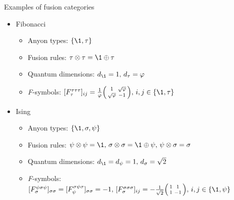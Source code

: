 \documentclass{fdubeamer}
\begin{document}
\begin{frame}{Examples of fusion categories}

\linespread{1.4}
\selectfont

\begin{itemize}
  \item Fibonacci

    \begin{itemize}
      \item Anyon types: $\{\1, \tau\}$
      \item Fusion rules: $\tau\otimes\tau=\1\oplus\tau$
      \item Quantum dimensions: $d_{\1}=1, \, d_\tau=\varphi$
      \item \textit{F}-symbols:
        $
          [F^{\tau\tau\tau}_\tau]_{ij} = \frac{1}{\varphi} \Bigl(\begin{smallmatrix} 1 & \sqrt\varphi \\ \sqrt\varphi & -1 \end{smallmatrix}\Bigr), \,
          i,j \in \{\1, \tau\}
        $
    \end{itemize}

  \item Ising

    \begin{itemize}
      \item Anyon types: $\{\1, \sigma, \psi\}$
      \item Fusion rules: $\psi\otimes\psi=\1, \, \sigma\otimes\sigma=\1\oplus\psi, \, \psi\otimes\sigma=\sigma$
      \item Quantum dimensions: $d_{\1}=d_\psi=1, \, d_\sigma=\sqrt2$
      \item \textit{F}-symbols:
        $
          [F^{\psi\sigma\psi}_\sigma]_{\sigma\sigma} = [F^{\sigma\psi\sigma}_\psi]_{\sigma\sigma} = -1, \,
          [F^{\sigma\sigma\sigma}_\sigma]_{ij} = -\frac{1}{\sqrt2} \Bigl(\begin{smallmatrix} 1 & 1 \\[0.5ex] 1 & -1 \end{smallmatrix}\Bigr), \,
          i,j \in \{\1, \psi\}
        $
    \end{itemize}
\end{itemize}

\end{frame}
\end{document}
